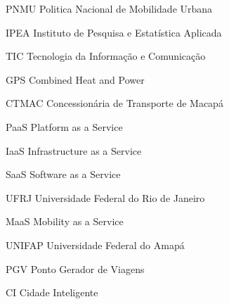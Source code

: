 %
%

\begin{siglas}
    \item[PNMU] Politica Nacional de Mobilidade Urbana
    \item[IPEA] Instituto de Pesquisa e Estatística Aplicada
    \item[TIC] Tecnologia da Informação e Comunicação 
    \item[GPS] Combined Heat and Power
    \item[CTMAC] Concessionária de Transporte de Macapá
    \item[PaaS] Platform as a Service
    \item[IaaS] Infrastructure as a Service
    \item[SaaS] Software as a Service
    \item[UFRJ] Universidade Federal do Rio de Janeiro
    \item[MaaS] Mobility as a Service
    \item[UNIFAP] Universidade Federal do Amapá
    \item[PGV] Ponto Gerador de Viagens
    \item[CI] Cidade Inteligente
\end{siglas}
